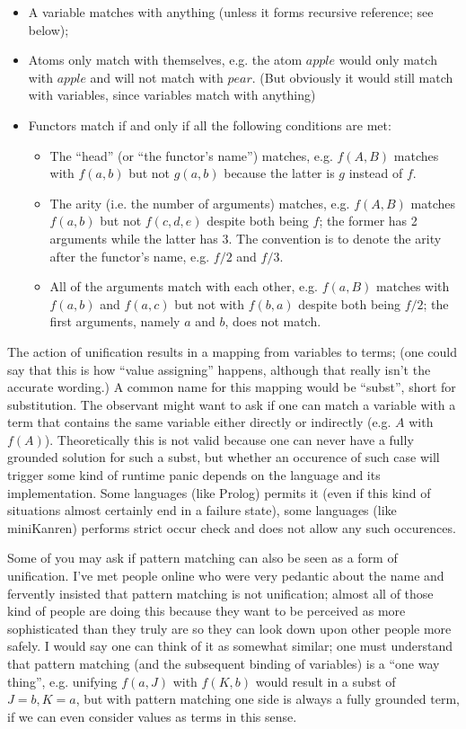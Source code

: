 \begin{itemize}
	\item A variable matches with anything (unless it forms recursive reference; see below);
	\item Atoms only match with themselves, e.g. the atom $apple$ would only match with $apple$ and will not match with $pear$. (But obviously it would still match with variables, since variables match with anything)
	\item Functors match if and only if all the following conditions are met:
	\begin{itemize}
		\item The ``head'' (or ``the functor's name'') matches, e.g. \(f(A,B)\) matches with \(f(a,b)\) but not \(g(a,b)\) because the latter is \(g\) instead of \(f\).
		\item The arity (i.e. the number of arguments) matches, e.g. \(f(A,B)\) matches \(f(a,b)\) but not \(f(c,d,e)\) despite both being \(f\); the former has 2 arguments while the latter has 3. The convention is to denote the arity after the functor's name, e.g. \(f/2\) and \(f/3\).
		\item All of the arguments match with each other, e.g. \(f(a, B)\) matches with \(f(a, b)\) and \(f(a, c)\) but not with \(f(b, a)\) despite both being \(f/2\); the first arguments, namely \(a\) and \(b\), does not match.
	\end{itemize}
\end{itemize}

The action of unification results in a mapping from variables to terms; (one could say that this is how ``value assigning'' happens, although that really isn't the accurate wording.) A common name for this mapping would be ``subst'', short for substitution. The observant might want to ask if one can match a variable with a term that contains the same variable either directly or indirectly (e.g. \(A\) with \(f(A)\)). Theoretically this is not valid because one can never have a fully grounded solution for such a subst, but whether an occurence of such case will trigger some kind of runtime panic depends on the language and its implementation. Some languages (like Prolog) permits it (even if this kind of situations almost certainly end in a failure state), some languages (like miniKanren) performs strict occur check and does not allow any such occurences.

Some of you may ask if pattern matching can also be seen as a form of unification. I've met people online who were very pedantic about the name and fervently insisted that pattern matching is not unification; almost all of those kind of people are doing this because they want to be perceived as more sophisticated than they truly are so they can look down upon other people more safely. I would say one can think of it as somewhat similar; one must understand that pattern matching (and the subsequent binding of variables) is a ``one way thing'', e.g. unifying \(f(a, J)\) with \(f(K, b)\) would result in a subst of \(J = b, K = a\), but with pattern matching one side is always a fully grounded term, if we can even consider values as terms in this sense.

